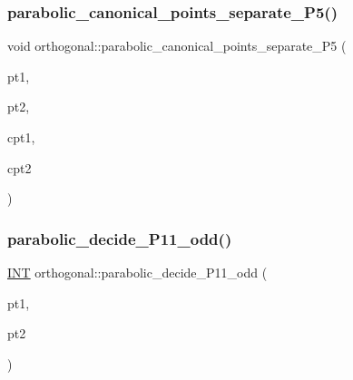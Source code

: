 \mbox{\label{classorthogonal_a8d0027eb77931aa6f8651f392b9b4e79}} 
\subsubsection{\texorpdfstring{parabolic\+\_\+canonical\+\_\+points\+\_\+separate\+\_\+\+P5()}{parabolic\_canonical\_points\_separate\_P5()}}
{\footnotesize\ttfamily void orthogonal\+::parabolic\+\_\+canonical\+\_\+points\+\_\+separate\+\_\+\+P5 (\begin{DoxyParamCaption}\item[{\mbox{\hyperlink{galois_8h_a09fddde158a3a20bd2dcadb609de11dc}{I\+NT}}}]{pt1,  }\item[{\mbox{\hyperlink{galois_8h_a09fddde158a3a20bd2dcadb609de11dc}{I\+NT}}}]{pt2,  }\item[{\mbox{\hyperlink{galois_8h_a09fddde158a3a20bd2dcadb609de11dc}{I\+NT}} \&}]{cpt1,  }\item[{\mbox{\hyperlink{galois_8h_a09fddde158a3a20bd2dcadb609de11dc}{I\+NT}} \&}]{cpt2 }\end{DoxyParamCaption})}

\mbox{\label{classorthogonal_a332147c62a37d11f4c3bbb7e83437e29}} 
\subsubsection{\texorpdfstring{parabolic\+\_\+decide\+\_\+\+P11\+\_\+odd()}{parabolic\_decide\_P11\_odd()}}
{\footnotesize\ttfamily \mbox{\hyperlink{galois_8h_a09fddde158a3a20bd2dcadb609de11dc}{I\+NT}} orthogonal\+::parabolic\+\_\+decide\+\_\+\+P11\+\_\+odd (\begin{DoxyParamCaption}\item[{\mbox{\hyperlink{galois_8h_a09fddde158a3a20bd2dcadb609de11dc}{I\+NT}}}]{pt1,  }\item[{\mbox{\hyperlink{galois_8h_a09fddde158a3a20bd2dcadb609de11dc}{I\+NT}}}]{pt2 }\end{DoxyParamCaption})}

